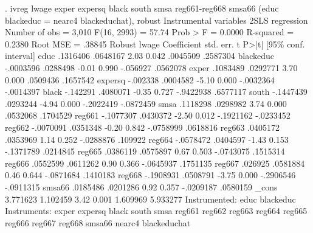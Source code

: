 . ivreg lwage exper expersq black south smsa reg661-reg668 smsa66 (educ blackeduc = nearc4 blackeduchat), robust
{\smallskip}
Instrumental variables 2SLS regression          Number of obs     =      3,010
                                                F(16, 2993)       =      57.74
                                                Prob > F          =     0.0000
                                                R-squared         =     0.2380
                                                Root MSE          =     .38845
{\smallskip}
             {\VBAR}               Robust
       lwage {\VBAR} Coefficient  std. err.      t    P>|t|     [95\% conf. interval]
        educ {\VBAR}   .1316406   .0648167     2.03   0.042     .0045509    .2587304
   blackeduc {\VBAR}  -.0003596   .0288498    -0.01   0.990     -.056927    .0562078
       exper {\VBAR}   .1083489   .0292771     3.70   0.000     .0509436    .1657542
     expersq {\VBAR}   -.002338   .0004582    -5.10   0.000    -.0032364   -.0014397
       black {\VBAR}   -.142291   .4080071    -0.35   0.727    -.9422938    .6577117
       south {\VBAR}  -.1447439   .0293244    -4.94   0.000    -.2022419   -.0872459
        smsa {\VBAR}   .1118298   .0298982     3.74   0.000     .0532068    .1704529
      reg661 {\VBAR}  -.1077307   .0430372    -2.50   0.012    -.1921162   -.0233452
      reg662 {\VBAR}  -.0070091   .0351348    -0.20   0.842    -.0758999    .0618816
      reg663 {\VBAR}   .0405172   .0353969     1.14   0.252    -.0288876     .109922
      reg664 {\VBAR}  -.0578472   .0404597    -1.43   0.153    -.1371789    .0214845
      reg665 {\VBAR}   .0386119   .0575897     0.67   0.503    -.0743075    .1515314
      reg666 {\VBAR}   .0552599   .0611262     0.90   0.366    -.0645937    .1751135
      reg667 {\VBAR}    .026925   .0581884     0.46   0.644    -.0871684    .1410183
      reg668 {\VBAR}  -.1908931   .0508791    -3.75   0.000    -.2906546   -.0911315
      smsa66 {\VBAR}   .0185486   .0201286     0.92   0.357    -.0209187    .0580159
       _cons {\VBAR}   3.771623   1.102459     3.42   0.001     1.609969    5.933277
Instrumented: educ blackeduc
 Instruments: exper expersq black south smsa reg661 reg662 reg663 reg664
              reg665 reg666 reg667 reg668 smsa66 nearc4 blackeduchat
{\smallskip}
